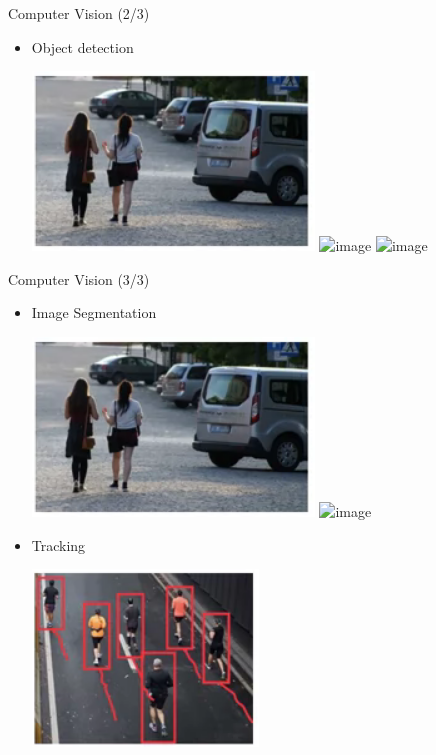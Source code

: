 \documentclass[pdf]{beamer}
\theoremstyle{mystyle}
\begin{document}
\begin{frame}{Computer Vision (2/3)}
	\begin{itemize}
		\item Object detection
		\begin{center}
			\includegraphics[scale=.4]{object-detection-1} \qquad \includegraphics<2->[scale=.4]{object-detection-2}
			\bigskip			
			\includegraphics<3->[scale=.4]{object-detection-3}	
		\end{center}
	\end{itemize}
\end{frame}

\begin{frame}{Computer Vision (3/3)}
	\begin{itemize}
		\item Image Segmentation
		\begin{center}
			\includegraphics[scale=.4]{object-detection-1} \qquad \includegraphics<2->[scale=.4]{image-segmentation}	
		\end{center}
		\item<3-> Tracking
		\begin{center}
			\includegraphics[scale=.4]{tracking}
		\end{center}
	\end{itemize}
\end{frame}
\end{document}
